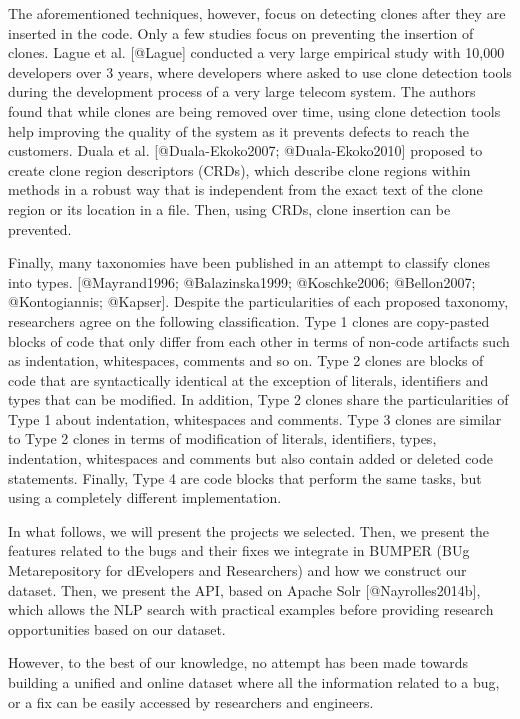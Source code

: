The aforementioned techniques, however, focus on detecting clones after
they are inserted in the code. Only a few studies focus on preventing
the insertion of clones. Lague et al. {[}@Lague{]} conducted a very
large empirical study with 10,000 developers over 3 years, where
developers where asked to use clone detection tools during the
development process of a very large telecom system. The authors found
that while clones are being removed over time, using clone detection
tools help improving the quality of the system as it prevents defects to
reach the customers. Duala et al. {[}@Duala-Ekoko2007;
@Duala-Ekoko2010{]} proposed to create clone region descriptors (CRDs),
which describe clone regions within methods in a robust way that is
independent from the exact text of the clone region or its location in a
file. Then, using CRDs, clone insertion can be prevented.

Finally, many taxonomies have been published in an attempt to classify
clones into types. {[}@Mayrand1996; @Balazinska1999; @Koschke2006;
@Bellon2007; @Kontogiannis; @Kapser{]}. Despite the particularities of
each proposed taxonomy, researchers agree on the following
classification. Type 1 clones are copy-pasted blocks of code that only
differ from each other in terms of non-code artifacts such as
indentation, whitespaces, comments and so on. Type 2 clones are blocks
of code that are syntactically identical at the exception of literals,
identifiers and types that can be modified. In addition, Type 2 clones
share the particularities of Type 1 about indentation, whitespaces and
comments. Type 3 clones are similar to Type 2 clones in terms of
modification of literals, identifiers, types, indentation, whitespaces
and comments but also contain added or deleted code statements. Finally,
Type 4 are code blocks that perform the same tasks, but using a
completely different implementation.

In what follows, we will present the projects we selected. Then, we
present the features related to the bugs and their fixes we integrate in
BUMPER (BUg Metarepository for dEvelopers and Researchers) and how we
construct our dataset. Then, we present the API, based on Apache Solr
{[}@Nayrolles2014b{]}, which allows the NLP search with practical
examples before providing research opportunities based on our dataset.

However, to the best of our knowledge, no attempt has been made towards
building a unified and online dataset where all the information related
to a bug, or a fix can be easily accessed by researchers and engineers.

